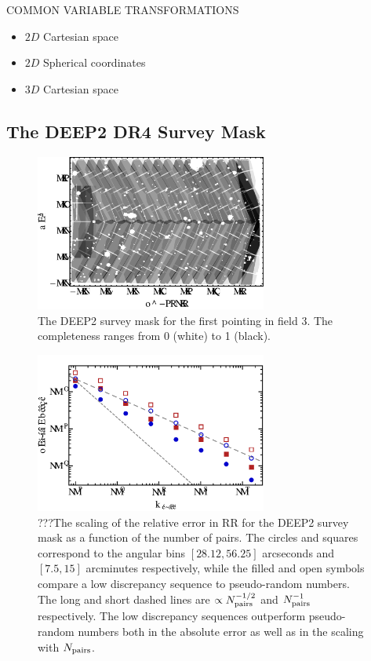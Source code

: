 \documentclass[usenatbib]{mn2e}
\begin{document}
COMMON VARIABLE TRANSFORMATIONS
\begin{itemize}
  \item $2D$ Cartesian space
  \item $2D$ Spherical coordinates
  \item $3D$ Cartesian space
\end{itemize}

\subsection{The DEEP2 DR4 Survey Mask}

\begin{figure}
\includegraphics[width=3in]{plots/deep2mask}
\caption{The DEEP2 survey mask for the first pointing in field 3. The
completeness ranges from 0 (white) to 1 (black). }
\label{fig:deep2mask}
\end{figure}

\begin{figure}
\includegraphics[width=3in]{plots/deep2rrcomp1}
\caption{???The scaling of the relative error in RR for the DEEP2 survey mask as
a function of the number of pairs. The circles and squares correspond to the
angular bins $[28.12,56.25]$ arcseconds and $[7.5,15]$ arcminutes respectively,
while the filled and open symbols compare a low discrepancy
sequence to pseudo-random numbers. The long and short dashed lines are
$\propto N_{\rm pairs}^{-1/2}$ and $N_{\rm pairs}^{-1}$ respectively. The low
discrepancy sequences outperform pseudo-random numbers both in the
absolute error as well as in the scaling with $N_{\rm pairs}$.}
\label{fig:deep2comp1}
\end{figure}
\end{document}
